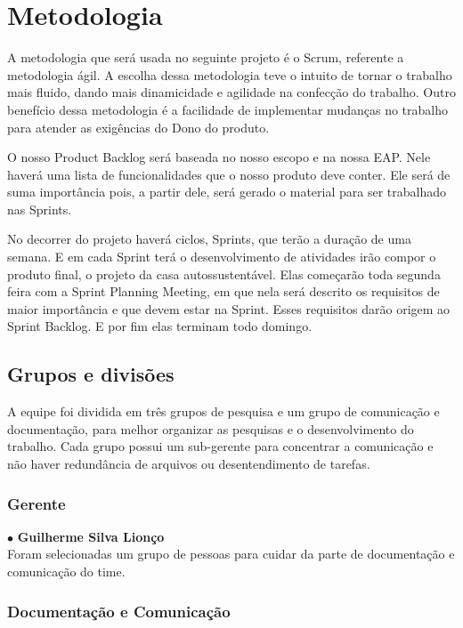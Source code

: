 \section{Metodologia}

	A metodologia que será usada no seguinte projeto é o Scrum, referente a metodologia ágil. A escolha dessa metodologia teve o intuito de tornar o trabalho mais fluido, dando mais dinamicidade e agilidade na confecção do trabalho. Outro benefício dessa metodologia é a facilidade de implementar mudanças no trabalho para atender as exigências do Dono do produto.
	
	O nosso Product Backlog será baseada no nosso escopo e na nossa \gls{EAP}. Nele haverá uma lista de funcionalidades que o nosso produto deve conter. Ele será de suma importância pois, a partir dele, será gerado o material para ser trabalhado nas Sprints.
	
	No decorrer do projeto haverá ciclos, Sprints, que terão a duração de uma semana. E em cada Sprint terá o desenvolvimento de atividades irão compor o produto final, o projeto da casa autossustentável. Elas começarão toda segunda feira com a Sprint Planning Meeting, em que nela será descrito os requisitos de maior importância e que devem estar na Sprint. Esses requisitos darão origem ao Sprint Backlog. E por fim elas terminam todo domingo. 
	
\subsection{Grupos e divisões}

	A equipe foi dividida em três grupos de pesquisa e um grupo de comunicação e documentação, para melhor organizar as pesquisas e o desenvolvimento do trabalho. Cada grupo possui um sub-gerente para concentrar a comunicação e não haver redundância de arquivos ou desentendimento de tarefas. 

\subsubsection{Gerente}
$\bullet$ \textbf{Guilherme Silva Lionço}\\

Foram selecionadas um grupo de pessoas para cuidar da parte de documentação e comunicação do time.
\subsubsection{Documentação e Comunicação}

